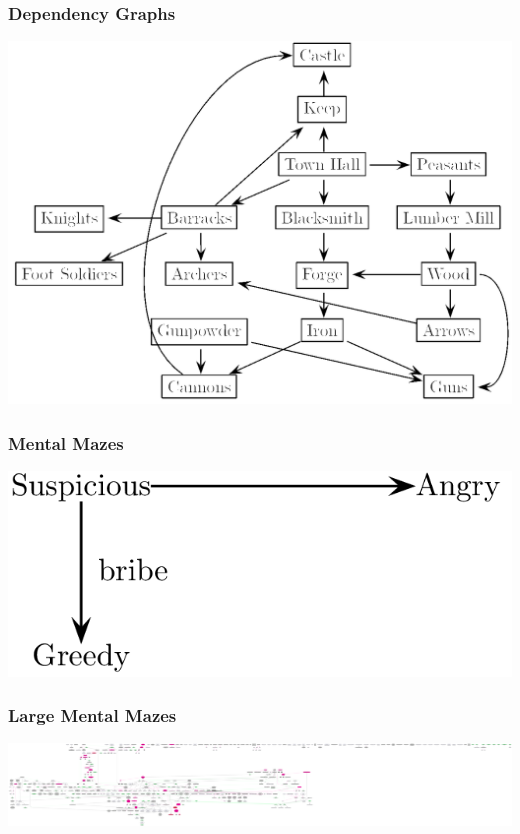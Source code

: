 \documentclass[handout,t,compress]{beamer}
\newcommand{\bframe}[1]{\begin{frame}[fragile]\frametitle{{#1}}}
\begin{document}
\bframe{Dependency Graphs}
\includegraphics[scale=0.25]{graphsfigure01.png}


\end{frame}


\bframe{Mental Mazes}

\vfill
\begin{center}

\includegraphics[scale=0.25]{graphsfigure02.png}


\end{center}
\vfill

\end{frame}

\bframe{Large Mental Mazes}
\includegraphics{largedialoguemaze.png}
\end{frame}
\end{document}
